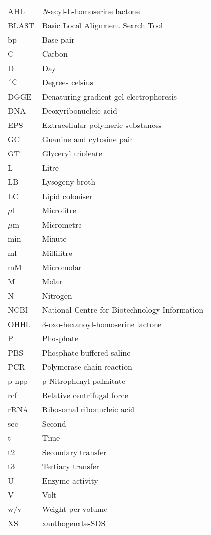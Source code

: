 \documentclass[11pt]{article}
\begin{document}
\begin{table}
\begin{tabular}{  p{6.9cm} | p{6.9cm} }
\hline
AHL & \emph{N}-acyl-L-homoserine lactone \\
BLAST & Basic Local Alignment Search Tool  \\
bp & Base pair \\
C & Carbon \\
D & Day \\
$\,^{\circ}\mathrm{C}$ & Degrees celsius \\
DGGE & Denaturing gradient gel electrophoresis \\
DNA & Deoxyribonucleic acid  \\
 EPS & Extracellular polymeric substances \\
 GC & Guanine and cytosine pair \\
GT & Glyceryl trioleate \\
L & Litre \\
LB & Lysogeny broth \\
LC & Lipid coloniser \\
$\mu$l & Microlitre \\
$\mu$m & Micrometre \\
min & Minute \\
ml & Millilitre \\
mM & Micromolar \\
M & Molar \\
N & Nitrogen \\
NCBI &  National Centre for Biotechnology Information \\
OHHL & 3-oxo-hexanoyl-homoserine lactone \\
P  &  Phosphate \\
PBS & Phosphate buffered saline \\
PCR & Polymerase chain reaction \\
 p-npp & p-Nitrophenyl palmitate \\
rcf & Relative centrifugal force \\
rRNA & Ribosomal ribonucleic acid \\
sec & Second \\
t & Time \\
 t2 & Secondary transfer \\
t3 & Tertiary transfer \\
U & Enzyme activity \\
V & Volt \\
w/v & Weight per volume \\
XS & xanthogenate-SDS \\
  \hline
\end{tabular}
\end{table}
\end{document}
